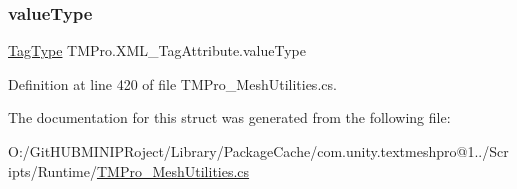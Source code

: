 \mbox{\label{struct_t_m_pro_1_1_x_m_l___tag_attribute_a5959a81be64a0d39cbfcc277bb9abf64}} 
\subsubsection{\texorpdfstring{valueType}{valueType}}
{\footnotesize\ttfamily \mbox{\hyperlink{namespace_t_m_pro_a3a02df19cfabd98e98ddde29b9c3cbde}{Tag\+Type}} T\+M\+Pro.\+X\+M\+L\+\_\+\+Tag\+Attribute.\+value\+Type}



Definition at line 420 of file T\+M\+Pro\+\_\+\+Mesh\+Utilities.\+cs.



The documentation for this struct was generated from the following file\+:\begin{DoxyCompactItemize}
\item 
O\+:/\+Git\+H\+U\+B\+M\+I\+N\+I\+P\+Roject/\+Library/\+Package\+Cache/com.\+unity.\+textmeshpro@1../\+Scripts/\+Runtime/\mbox{\hyperlink{_t_m_pro___mesh_utilities_8cs}{T\+M\+Pro\+\_\+\+Mesh\+Utilities.\+cs}}\end{DoxyCompactItemize}
